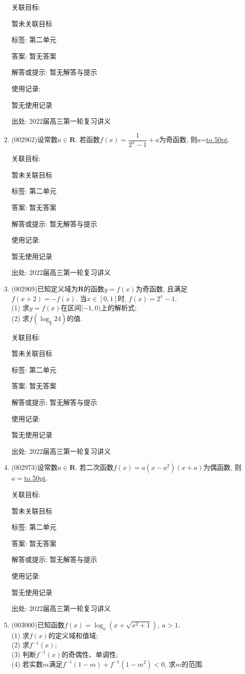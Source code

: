 \documentclass[10pt,a4paper]{article}
\newcommand{\blank}[1]{\underline{\hbox to #1pt{}}}
\begin{document}
\begin{enumerate}[1.]
关联目标:

暂未关联目标



标签: 第二单元

答案: 暂无答案

解答或提示: 暂无解答与提示

使用记录:

暂无使用记录


出处: 2022届高三第一轮复习讲义
\item { (002962)}设常数$a\in \mathbf{R}$. 若函数$f(x)=\dfrac 1{2^x-1}+a$为奇函数, 则$a$=\blank{50}.


关联目标:

暂未关联目标



标签: 第二单元

答案: 暂无答案

解答或提示: 暂无解答与提示

使用记录:

暂无使用记录


出处: 2022届高三第一轮复习讲义
\item { (002969)}已知定义域为$\mathbf{R}$的函数$y=f(x)$为奇函数, 且满足$f(x+2)=-f(x)$. 当$x\in [0,1]$时, $f(x)=2^x-1$.\\
(1) 求$y=f(x)$在区间$[-1,0)$上的解析式;\\
(2) 求$f(\log_{\frac 12}24)$的值.


关联目标:

暂未关联目标



标签: 第二单元

答案: 暂无答案

解答或提示: 暂无解答与提示

使用记录:

暂无使用记录


出处: 2022届高三第一轮复习讲义
\item { (002973)}设常数$a\in \mathbf{R}$. 若二次函数$f(x)=a(x-a^2)(x+a)$为偶函数, 则$a=$\blank{50}.


关联目标:

暂未关联目标



标签: 第二单元

答案: 暂无答案

解答或提示: 暂无解答与提示

使用记录:

暂无使用记录


出处: 2022届高三第一轮复习讲义
\item { (003000)}已知函数$f(x)=\log_a(x+\sqrt{x^2+1}), \ a>1$.\\
(1) 求$f(x)$的定义域和值域;\\
(2) 求$f^{-1}(x)$;\\
(3) 判断$f^{-1}(x)$的奇偶性、单调性;\\
(4) 若实数$m$满足$f^{-1}(1-m)+f^{-1}(1-m^2)<0$, 求$m$的范围.



\end{enumerate}
\end{document}
